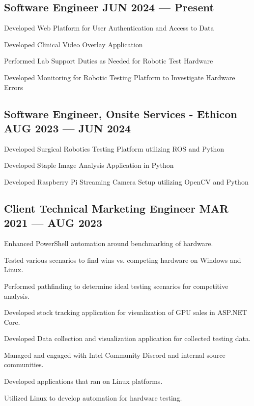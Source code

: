 \subsection{{Software Engineer \hfill JUN 2024 --- Present}}
\begin{zitemize}
\item Developed Web Platform for User Authentication and Access to Data
\item Developed Clinical Video Overlay Application
\item Performed Lab Support Duties as Needed for Robotic Test Hardware
\item Developed Monitoring for Robotic Testing Platform to Investigate Hardware Errors
\end{zitemize}

\subsection{{Software Engineer, Onsite Services - Ethicon \hfill AUG 2023 --- JUN 2024}}
\begin{zitemize}
\item Developed Surgical Robotics Testing Platform utilizing ROS and Python
\item Developed Staple Image Analysis Application in Python
\item Developed Raspberry Pi Streaming Camera Setup utilizing OpenCV and Python
\end{zitemize}

\subsection{{Client Technical Marketing Engineer \hfill MAR 2021 --- AUG 2023}}
\begin{zitemize}
\item Enhanced PowerShell automation around benchmarking of hardware.
\item Tested various scenarios to find wins vs. competing hardware on Windows and Linux.
\item Performed pathfinding to determine ideal testing scenarios for competitive analysis.
\item Developed stock tracking application for visualization of GPU sales in ASP.NET Core.
\item Developed Data collection and visualization application for collected testing data.
\item Managed and engaged with Intel Community Discord and internal source communities.
\item Developed applications that ran on Linux platforms.
\item Utilized Linux to develop automation for hardware testing.
\end{zitemize}


